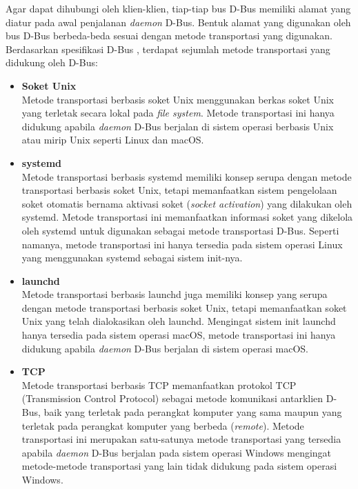 Agar dapat dihubungi oleh klien-klien, tiap-tiap bus D-Bus memiliki alamat yang diatur pada awal penjalanan \textit{daemon} D-Bus. Bentuk alamat yang digunakan oleh bus D-Bus berbeda-beda sesuai dengan metode transportasi yang digunakan. Berdasarkan spesifikasi D-Bus \cite{dbus-specification}, terdapat sejumlah metode transportasi yang didukung oleh D-Bus:
\begin{itemize}
    \item \textbf{Soket Unix}\\
    Metode transportasi berbasis soket Unix menggunakan berkas soket Unix yang terletak secara lokal pada \textit{file system}. Metode transportasi ini hanya didukung apabila \textit{daemon} D-Bus berjalan di sistem operasi berbasis Unix atau mirip Unix seperti Linux dan macOS.

    \item \textbf{systemd}\\
    Metode transportasi berbasis systemd memiliki konsep serupa dengan metode transportasi berbasis soket Unix, tetapi memanfaatkan sistem pengelolaan soket otomatis bernama aktivasi soket (\textit{socket activation}) yang dilakukan oleh systemd. Metode transportasi ini memanfaatkan informasi soket yang dikelola oleh systemd untuk digunakan sebagai metode transportasi D-Bus. Seperti namanya, metode transportasi ini hanya tersedia pada sistem operasi Linux yang menggunakan systemd sebagai sistem init-nya.
    
    \item \textbf{launchd}\\
    Metode transportasi berbasis launchd juga memiliki konsep yang serupa dengan metode transportasi berbasis soket Unix, tetapi memanfaatkan soket Unix yang telah dialokasikan oleh launchd. Mengingat sistem init launchd hanya tersedia pada sistem operasi macOS, metode transportasi ini hanya didukung apabila \textit{daemon} D-Bus berjalan di sistem operasi macOS.
    
    \item \textbf{TCP}\\
    Metode transportasi berbasis TCP memanfaatkan protokol TCP (Transmission Control Protocol) sebagai metode komunikasi antarklien D-Bus, baik yang terletak pada perangkat komputer yang sama maupun yang terletak pada perangkat komputer yang berbeda (\textit{remote}). Metode transportasi ini merupakan satu-satunya metode transportasi yang tersedia apabila \textit{daemon} D-Bus berjalan pada sistem operasi Windows mengingat metode-metode transportasi yang lain tidak didukung pada sistem operasi Windows.


\end{itemize}
